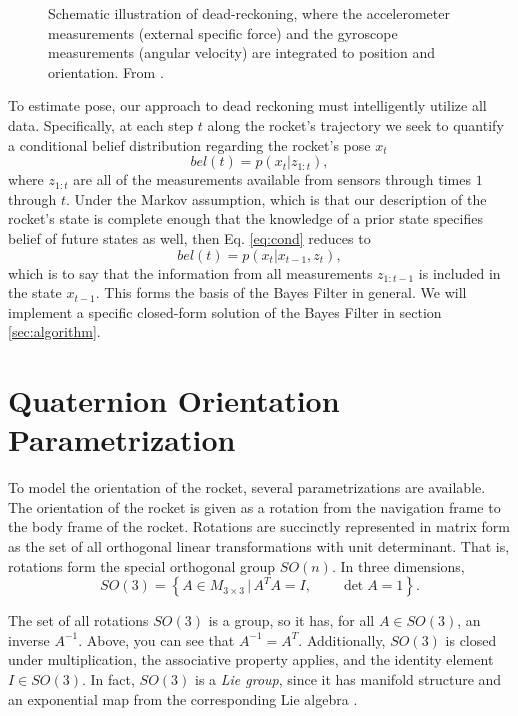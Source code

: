 \documentclass{article}
\begin{document}
\begin{figure}[ht]
  \centering
  \caption{Schematic illustration of dead-reckoning, where the accelerometer measurements (external specific force) and the gyroscope measurements (angular velocity) are integrated to position and orientation. From \cite{usinginertialsensors}.}
  \label{fig:dr}
\end{figure}

To estimate pose, our approach to dead reckoning must intelligently utilize all data. Specifically, at each step $t$ along the rocket's trajectory we seek to quantify a conditional belief distribution regarding the rocket's pose $x_t$
\[ \label{eq:cond}
bel(t) = p(x_t | z_{1:t}),
\]
where $z_{1:t}$ are all of the measurements available from sensors through times $1$ through $t$. Under the Markov assumption, which is that our description of the rocket's state is complete enough that the knowledge of a prior state specifies belief of future states as well, then Eq. \ref{eq:cond} reduces to
\[
bel(t) = p(x_t | x_{t-1}, z_t),
\]
which is to say that the information from all measurements $z_{1:t-1}$ is included in the state $x_{t-1}$. This forms the basis of the Bayes Filter in general. We will implement a specific closed-form solution of the Bayes Filter in section \ref{sec:algorithm}.

\section{Quaternion Orientation Parametrization}
To model the orientation of the rocket, several parametrizations are available. The orientation of the rocket is given as a rotation from the navigation frame to the body frame of the rocket. Rotations are succinctly represented in matrix form as the set of all orthogonal linear transformations with unit determinant. That is, rotations form the special orthogonal group $SO(n)$. In three dimensions, 
\[
SO(3) = \left\{A \in M_{3\times 3} \,|\, A^TA = I, \qquad \det A = 1 \right\}.
\]

The set of all rotations $SO(3)$ is a group, so it has, for all $A \in SO(3)$, an inverse $A^{-1}$. Above, you can see that $A^{-1} = A^T$. Additionally, $SO(3)$ is closed under multiplication, the associative property applies, and the identity element $I \in SO(3)$. In fact, $SO(3)$ is a \textit{Lie group}, since it has manifold structure and an exponential map from the corresponding Lie algebra \cite{kok}.
\end{document}
